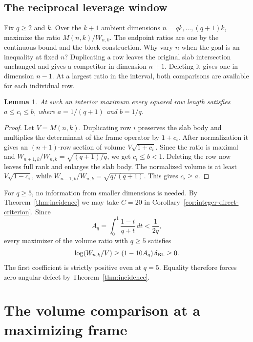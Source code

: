 \documentclass[11pt,a4paper]{article}
\newtheorem{lemma}[theorem]{Lemma}
\theoremstyle{remark}\newtheorem{remark}[theorem]{Remark}
\numberwithin{equation}{section}
\begin{document}
\subsection{The reciprocal leverage window}

Fix \(q\ge2\) and \(k\). Over the \(k+1\) ambient dimensions
\(n=qk,\ldots,(q+1)k\), maximize the ratio \(M(n,k)/W_{n,k}\).
The endpoint ratios are one by the continuous bound and the block
construction. Why vary \(n\) when the goal is an inequality at fixed
\(n\)? Duplicating a row leaves the original slab intersection
unchanged and gives a competitor in dimension \(n+1\). Deleting it
gives one in dimension \(n-1\). At a largest ratio in the interval,
both comparisons are available for each individual row.

\begin{lemma}\label{lem:window}
At such an interior maximum every squared row length satisfies
\(a\le c_i\le b\), where \(a=1/(q+1)\) and \(b=1/q\).
\end{lemma}
\begin{proof}
Let \(V=M(n,k)\). Duplicating row \(i\) preserves the slab body and
multiplies the determinant of the frame operator by \(1+c_i\).
After normalization it gives an \((n+1)\)-row section of volume
\(V\sqrt{1+c_i}\). Since the ratio is maximal and
\(W_{n+1,k}/W_{n,k}=\sqrt{(q+1)/q}\), we get \(c_i\le b<1\).
Deleting the row now leaves full rank and enlarges the slab body.
The normalized volume is at least \(V\sqrt{1-c_i}\), while
\(W_{n-1,k}/W_{n,k}=\sqrt{q/(q+1)}\). This gives \(c_i\ge a\).
\end{proof}

For \(q\ge5\), no information from smaller dimensions is needed.
By Theorem~\ref{thm:incidence} we may take \(C=20\) in
Corollary~\ref{cor:integer-direct-criterion}. Since
\[
 A_q=\int_0^1\frac{1-t}{q+t}\,dt<\frac1{2q},
\]
every maximizer of the volume ratio with \(q\ge5\) satisfies
\begin{equation}\label{eq:large-q-result}
 \log(W_{n,k}/V)\ge (1-10A_q)\,\delta_{\rm BL}\ge0 .
\end{equation}
The first coefficient is strictly positive even at \(q=5\). Equality
therefore forces zero angular defect by Theorem~\ref{thm:incidence}.

\section{The volume comparison at a maximizing frame}
\label{sec:extremal-comparison}
\end{document}

